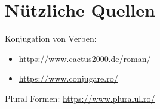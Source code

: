 \documentclass[11pt, oneside]{article}
\begin{document}
\section{Nützliche Quellen}
Konjugation von Verben: 
\begin{itemize}
    \item \url{https://www.cactus2000.de/roman/}\\
    \item \url{https://www.conjugare.ro/}\\
\end{itemize}
Plural Formen: \url{https://www.pluralul.ro/}\\

%
\newpage
\printindex
%
\end{document}
